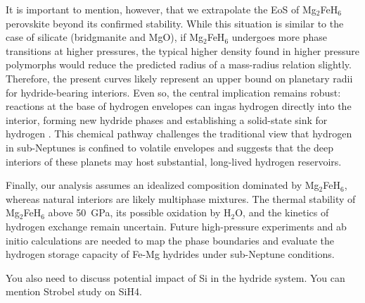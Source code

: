 \documentclass[draft,jgrga,12pt]{agujournal2019}
\begin{document}
It is important to mention, however, that we extrapolate the EoS of Mg$_2$FeH$_6$ perovskite beyond its confirmed stability.
While this situation is similar to the case of silicate (bridgmanite and MgO), if Mg$_2$FeH$_6$ undergoes more phase transitions at higher pressures, the typical higher density found in higher pressure polymorphs would reduce the predicted radius of a mass-radius relation slightly.  
Therefore, the present curves likely represent an upper bound on planetary radii for hydride-bearing interiors. 
Even so, the central implication remains robust: reactions at the base of hydrogen envelopes can ingas hydrogen directly into the interior, forming new hydride phases and establishing a solid-state sink for hydrogen \cite{kim_stability_2023}. 
This chemical pathway challenges the traditional view that hydrogen in sub-Neptunes is confined to volatile envelopes and suggests that the deep interiors of these planets may host substantial, long-lived hydrogen reservoirs.


Finally, our analysis assumes an idealized composition dominated by Mg$_2$FeH$_6$, whereas natural interiors are likely multiphase mixtures. 
The thermal stability of Mg$_2$FeH$_6$ above 50~{GPa}, its possible oxidation by H$_2$O, and the kinetics of hydrogen exchange remain uncertain. 
Future high-pressure experiments and ab initio  calculations are needed to map the phase boundaries and evaluate the hydrogen storage capacity of Fe-Mg hydrides under sub-Neptune conditions.
\begin{cbox}
    You also need to discuss potential impact of Si in the hydride system.  You can mention Strobel study on SiH4.
\end{cbox}


\clearpage




\end{document}
